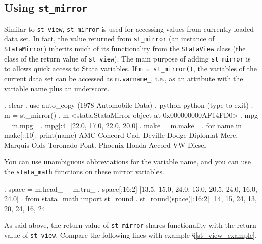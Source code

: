 \documentclass{article}
\begin{document}
\smallskip



\subsection{Using \lstinline$st_mirror$} \label{st_mirror_example}

Similar to \lstinline{st_view}, \lstinline{st_mirror} is used for accessing values from currently loaded data set. In fact, the value returned from \lstinline{st_mirror} (an instance of \lstinline$StataMirror$) inherits much of its functionality from the \lstinline$StataView$ class (the class of the return value of \lstinline{st_view}). The main purpose of adding \lstinline{st_mirror} is to allows quick access to Stata variables. If \lstinline{m = st_mirror()}, the variables of the current data set can be accessed as \lstinline{m.varname_}, i.e., as an attribute with the variable name plus an underscore.

\begin{stlog}
. clear
{\smallskip}
. use auto_copy
(1978 Automobile Data)
{\smallskip}
. python
 python (type {} to exit) 
{\bftt{>>>}}. m = st_mirror()
{\smallskip}
{\bftt{>>>}}. m
<stata.StataMirror object at 0x000000000AF14FD0>
{\smallskip}
{\bftt{>>>}}. mpg = m.mpg_
{\smallskip}
{\bftt{>>>}}. mpg[:4]
[22.0, 17.0, 22.0, 20.0]
{\smallskip}
{\bftt{>>>}}. make = m.make_
{\smallskip}
{\bftt{>>>}}. for name in make[::10]: print(name)
AMC Concord
Cad. Deville
Dodge Diplomat
Merc. Marquis
Olds Toronado
Pont. Phoenix
Honda Accord
VW Diesel

\end{stlog}

\medskip

You can use unambiguous abbreviations for the variable name, and you can use the \lstinline{stata_math} functions on these mirror variables.

\begin{stlog}
{\bftt{>>>}}. space = m.head_ + m.tru_
{\smallskip}
{\bftt{>>>}}. space[:16:2]
[13.5, 15.0, 24.0, 13.0, 20.5, 24.0, 16.0, 24.0]
{\smallskip}
{\bftt{>>>}}. from stata_math import st_round
{\smallskip}
{\bftt{>>>}}. st_round(space)[:16:2]
[14, 15, 24, 13, 20, 24, 16, 24]
{\smallskip}
\end{stlog}

\medskip

As said above, the return value of \lstinline{st_mirror} shares functionality with the return value of \lstinline{st_view}. Compare the following lines with example \S\ref{st_view_example}.
\end{document}
